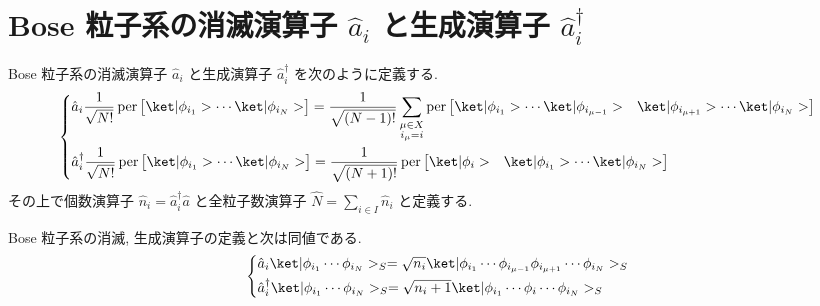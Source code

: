 \documentclass[uplatex,dvipdfmx,a4paper,11pt]{jlreq}
\DeclareMathOperator{\per}{per}
\numberwithin{equation}{section}
\theoremstyle{definition}
\begin{document}
\section{Bose 粒子系の消滅演算子 $\hat{a}_i$ と生成演算子 $\hat{a}_i^\dagger$}
\begin{definition}
  Bose 粒子系の消滅演算子 $\hat{a}_i$ と生成演算子 $\hat{a}_i^\dagger$ を次のように定義する.
  \begin{align}
    \begin{dcases}
      \hat{a}_i\frac{1}{\sqrt{N!}}\per\begin{bmatrix}\ket|\phi_{i_1}> \cdots \ket|\phi_{i_N}>\end{bmatrix} = \frac{1}{\sqrt{(N-1)!}}\sum_{\substack{\mu\in X \\ i_\mu = i}}\per\begin{bmatrix}\ket|\phi_{i_1}> \cdots \ket|\phi_{i_{\mu - 1}}> & \ket|\phi_{i_{\mu + 1}}> \cdots \ket|\phi_{i_N}>\end{bmatrix} \\
      \hat{a}_i^\dagger\frac{1}{\sqrt{N!}}\per\begin{bmatrix}\ket|\phi_{i_1}> \cdots \ket|\phi_{i_N}>\end{bmatrix} = \frac{1}{\sqrt{(N+1)!}}\per\begin{bmatrix}\ket|\phi_{i}> & \ket|\phi_{i_1}> \cdots \ket|\phi_{i_N}>\end{bmatrix}
    \end{dcases}
  \end{align}
  その上で個数演算子 $\hat{n}_i = \hat{a}_i^\dagger\hat{a}$ と全粒子数演算子 $\hat{N} = \sum_{i\in I}\hat{n}_i$ と定義する.
\end{definition}
\begin{theorem}
  Bose 粒子系の消滅, 生成演算子の定義と次は同値である.
  \begin{align}
    \begin{dcases}
      \hat{a}_i\ket|\phi_{i_1}\cdots\phi_{i_N}>_S = \sqrt{n_i}\ket|\phi_{i_1}\cdots\phi_{i_{\mu - 1}}\phi_{i_{\mu + 1}}\cdots\phi_{i_N}>_S \\
      \hat{a}_i^\dagger\ket|\phi_{i_1}\cdots\phi_{i_N}>_S = \sqrt{n_i+1}\ket|\phi_{i_1}\cdots\phi_{i}\cdots\phi_{i_N}>_S
    \end{dcases}
  \end{align}
  \label{Bose creation and annihilation 1}
\end{theorem}
\end{document}
